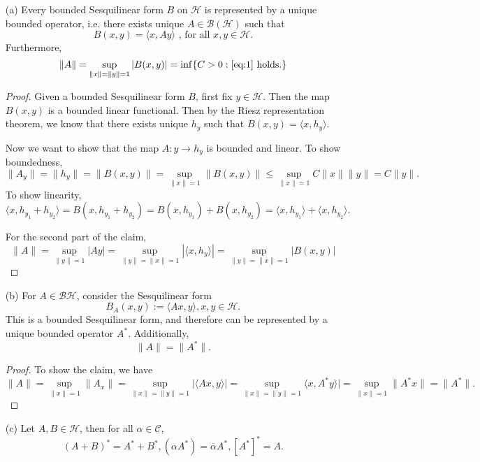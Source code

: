 \documentclass[12pt]{amsart}
\newcommand{\eq}[1]{\begin{equation*}#1\end{equation*}}
\begin{document}
\begin{itemize}
    \item [(a)] Every bounded Sesquilinear form $B$ on $\mathscr{H}$ is represented by a unique bounded operator, i.e. there exists unique $A \in \mathcal{B}(\mathscr{H})$ such that 
    \eq{B(x, y) = \langle x, Ay \rangle \text{ , for all } x, y \in \mathscr{H}.}
    Furthermore,
    \eq{\|A\| = \sup_{\|x\|=\|y\|=1} |B(x, y)| = \inf \{C > 0 : \eqref{eq:1} \text{ holds.}\}}
    
    \begin{proof}
        Given a bounded Sesquilinear form $B$, first fix $y \in \mathscr{H}$. Then the map $B(x, y)$ is a bounded linear functional. Then by the Riesz representation theorem, we know that there exists unique $h_y$ such that $B(x, y) = \langle x, h_y\rangle$.

        Now we want to show that the map $A : y \to h_y$ is bounded and linear. To show boundedness,
        \eq{\|A_y \| = \|h_y\| = \|B(x, y)\| = \sup_{\|x\|= 1} \|B(x,y)\| \leq \sup_{\|x\| = 1} C\|x\| \|y\| = C\|y\|.}
        To show linearity,
        \eq{\langle x, h_{y_1} + h_{y_2} \rangle = B(x, h_{y_1} + h_{y_2}) = B(x, h_{y_1}) + B(x, h_{y_2}) = \langle x, h_{y_1} \rangle + \langle x, h_{y_2}\rangle.}

        For the second part of the claim,
        \eq{\|A\| = \sup_{\|y\| = 1} |Ay| = \sup_{\|y\| = \|x\| = 1} |\langle x, h_y \rangle| = \sup_{\|y\|= \|x\| = 1} |B(x, y)|}
    \end{proof}

    \item [(b)] For $A \in \mathcal{B}\mathscr{H}$, consider the Sesquilinear form
    \eq{B_A (x, y) := \langle Ax, y \rangle , x, y \in \mathscr{H}.}
    This is a bounded Sesquilinear form, and therefore can be represented by a unique bounded operator $A^*$. Additionally,
    \eq{\|A\| = \|A^*\|.}

    \begin{proof}
        To show the claim, we have
        \eq{\|A\| = \sup_{\|x\| = 1} \|A_x\| = \sup_{ \|x\| = \|y\| = 1} |\langle Ax, y\rangle| = \sup_{ \|x\| = \|y\| = 1} \langle x, A^*y \rangle| = \sup_{\|x\| = 1} \|A^*x\| = \|A^*\|.}
    \end{proof}

    \item [(c)] Let $A, B \in \mathscr{H}$, then for all $ \alpha \in \mathcal{C}$,
    \eq{(A + B)^* = A^* + B^*, (\alpha A^*) = \overline{\alpha} A^* , [A^*]^* = A.}


\end{itemize}
\end{document}
